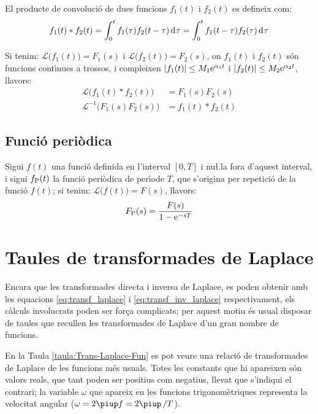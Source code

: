 El producte de convoluci\'{o} de dues funcions $f_1(t)$ i $f_2(t)$ es
defineix com:
\begin{equation}
    f_1(t) * f_2(t) = \int_0^t f_1(\tau) f_2(t-\tau) \diff\tau =
    \int_0^t f_1(t-\tau) f_2(\tau) \diff\tau
\end{equation}

Si tenim: $\mathcal{L} \bigl(f_1(t) \bigr) = F_1(s)$ i $\mathcal{L}
\bigl(f_2(t) \bigr) = F_2(s)$, on $f_1(t)$ i $f_2(t)$ s\'{o}n funcions
cont\'{\i}nues a trossos, i compleixen $|f_1(t)|\leq M_1\mathrm{e}^{\alpha_1 t}$
i $|f_2(t)|\leq M_2\mathrm{e}^{\alpha_2 t}$, llavors:
\begin{align}
    \mathcal{L} \bigl( f_1(t) * f_2(t) \bigr) &= F_1(s) F_2(s)\\
    \mathcal{L}^{-1} \bigl( F_1(s) F_2(s) \bigr) &= f_1(t) * f_2(t)
\end{align}

\subsection{Funci\'{o} peri\`{o}dica}

Sigui $f(t)$ una funci\'{o} definida en l'interval $[0,T]$ i nu{\l.l}a
fora d'aquest interval, i sigui $f_\mathrm{P}(t)$ la funci\'{o} peri\`{o}dica de
per\'{\i}ode $T$, que s'origina per repetici\'{o} de la funci\'{o} $f(t)$; si
tenim: $\mathcal{L} \bigl(f(t) \bigr) = F(s)$, llavors:
\begin{equation}
    F_\mathrm{P}(s) = \frac{F(s)}{1-\mathrm{e}^{-sT}}
\end{equation}

\section{Taules de transformades de Laplace}

Encara que les transformades directa i inversa de Laplace, es poden
obtenir amb les equacions \eqref{eq:transf_laplace} i
\eqref{eq:transf_inv_laplace} respectivament, els c\`{a}lculs
involucrats poden ser for\c{c}a complicats; per aquest motiu \'{e}s usual
disposar de taules que recullen les transformades de Laplace d'un
gran nombre de funcions.

En la Taula \vref{taula:Trans-Laplace-Fun} es pot veure una relaci\'{o} de
transformades de Laplace de les funcions m\'{e}s usuals. Totes les
constants que hi apareixen s\'{o}n valors reals, que tant poden ser
positius com negatius, llevat que s'indiqui el contrari; la variable
$\omega$ que apareix en les funcions trigonom\`{e}triques representa la
velocitat angular ($\omega=2\piup f=2\piup\,/T$).

